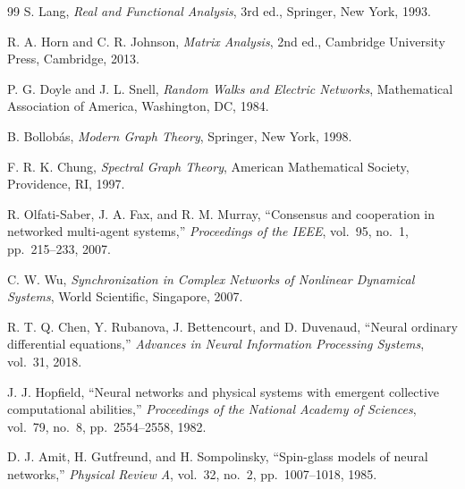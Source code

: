 \documentclass[11pt]{article}
\begin{document}
\begin{thebibliography}{99}
S. Lang,
\emph{Real and Functional Analysis},
3rd ed., Springer, New York, 1993.

R. A. Horn and C. R. Johnson,
\emph{Matrix Analysis},
2nd ed., Cambridge University Press, Cambridge, 2013.

P. G. Doyle and J. L. Snell,
\emph{Random Walks and Electric Networks},
Mathematical Association of America, Washington, DC, 1984.

B. Bollob\'as,
\emph{Modern Graph Theory},
Springer, New York, 1998.

F. R. K. Chung,
\emph{Spectral Graph Theory},
American Mathematical Society, Providence, RI, 1997.

R. Olfati-Saber, J. A. Fax, and R. M. Murray,
``Consensus and cooperation in networked multi-agent systems,''
\emph{Proceedings of the IEEE}, vol.~95, no.~1, pp.~215--233, 2007.

C. W. Wu,
\emph{Synchronization in Complex Networks of Nonlinear Dynamical Systems},
World Scientific, Singapore, 2007.

R. T. Q. Chen, Y. Rubanova, J. Bettencourt, and D. Duvenaud,
``Neural ordinary differential equations,''
\emph{Advances in Neural Information Processing Systems}, vol.~31, 2018.

J. J. Hopfield,
``Neural networks and physical systems with emergent collective computational abilities,''
\emph{Proceedings of the National Academy of Sciences},
vol.~79, no.~8, pp.~2554--2558, 1982.

D. J. Amit, H. Gutfreund, and H. Sompolinsky,
``Spin-glass models of neural networks,''
\emph{Physical Review A}, vol.~32, no.~2, pp.~1007--1018, 1985.

\end{thebibliography}
\end{document}
